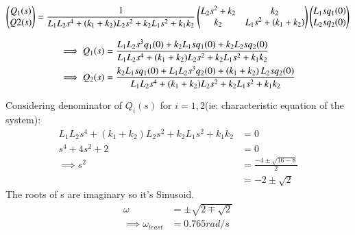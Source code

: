 \documentclass[journal,12pt,twocolumn]{IEEEtran}
\theoremstyle{remark}
\begin{document}
\begin{align}
\begin{pmatrix}
Q_1(s) \\
Q2(s)
\end{pmatrix}
= \frac{1}{L_1L_2s^4+(k_1+k_2)L_2s^2+k_2L_1s^2+k_1k_2} 
\begin{pmatrix}
L_2s^2+k_2 & k_2  \\
k_2& L_1s^2 + \left(k_1+k_2\right)
\end{pmatrix}
\begin{pmatrix}
L_1sq_1(0) \\
L_2sq_2(0)
\end{pmatrix}
\end{align}

\begin{align}
\implies Q_1(s)&=\frac{L_1L_2s^3q_1(0)+k_2L_1sq_1(0)+k_2L_2sq_2(0)}{L_1L_2s^4+(k_1+k_2)L_2s^2+k_2L_1s^2+k_1k_2} \\
\implies Q_2(s)&= \frac{k_2L_1sq_1(0)+L_1L_2s^3q_2(0)+\left(k_1+k_2\right)L_2sq_2(0)}{L_1L_2s^4+(k_1+k_2)L_2s^2+k_2L_1s^2+k_1k_2} 
\end{align}

Considering denominator of $Q_i(s)$ for $i=1,2$(ie: characteristic equation of the system):
\begin{align}
L_1L_2s^4+(k_1+k_2)L_2s^2+k_2L_1s^2+k_1k_2 &=0 \\
s^4 +4s^2+2&=0\\
\implies s^2&=\frac{-4\pm \sqrt{16-8}}{2} \\
&= -2 \pm \sqrt{2} 
\end{align}
The roots of s are imaginary so it's Sinusoid.
\begin{align}
\omega&=\pm\sqrt{2\mp \sqrt{2}}\\
\implies \omega_{least} &= 0.765 rad/s
\end{align} 

\end{document}
